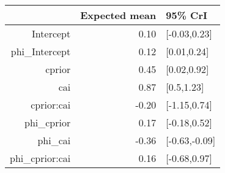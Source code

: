 \begin{tabular}{rrl}
  \hline
 & Expected mean & 95\% CrI \\ 
  \hline
Intercept & 0.10 & [-0.03,0.23] \\ 
  phi\_Intercept & 0.12 & [0.01,0.24] \\ 
  cprior & 0.45 & [0.02,0.92] \\ 
  cai & 0.87 & [0.5,1.23] \\ 
  cprior:cai & -0.20 & [-1.15,0.74] \\ 
  phi\_cprior & 0.17 & [-0.18,0.52] \\ 
  phi\_cai & -0.36 & [-0.63,-0.09] \\ 
  phi\_cprior:cai & 0.16 & [-0.68,0.97] \\ 
   \hline
\end{tabular}

